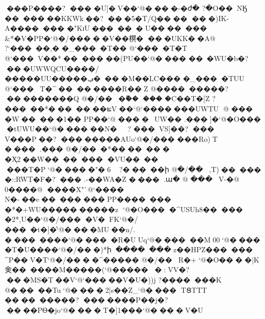 {{{{{{{{{{{{{{{{{{{{{{{{{{{{{{{{{���P����? ���	�U]�V��`@����-�ժ �   ?�O��NӃ
    �������KKWk��? ���5�T/Q���� ���)IK-A�� �����	�"KɪU������U�������
&*�V�PP�`@�/�����V��榠� ���UKK��A@ ?`�����,�     �_����T��     @`����T�T    @`���V��*   �����	��(P U��`@����	��~�WU�b�? ���UWWQCU����/�����UU�����ݠ����M��LC��� �_����TUU    @`���T�^   ��������R��Z @��������    �? ��������� Q @�/���ޫ    �� ���	�C��T�[Z ? �����*�   ������ʨV��`@`�������UWTU @ ���
�W   �����1��
PP��`@ ���� ~UW��%
.��� ]�`@�O���	�tUWU��`@����
��N� ? ���VS]�    �? ���	V���P ��? ��������AUo`@�/���	���Ro)T ����.���     @�/���*��   �����%
�Ҳ2��W�������
�VU����
���T�P`@�����"�6 ?�����ի     @�/��,T)   �����	�::RWT�F�? ���	.-��WA�Z ����.ա�     @ ���V-�    @ 0����@ ����X"`@`����	N�-��e��������PP�������
�*�+WU����������z%
`@�O���	�^USUh8�����	�2*, U��`@�/���
�V�FK`@�/����t�]\|�`@����MU��n/. ��������    `@�����R�UUq`@������M00`@����	�T�U����`@�/���)*ի�������z��HPZ� �����
^P��V�T`@�/����^����� @�/��R�+   `@�O����|K㑒������M��� ��(`@�����	�:VV�? ���MS�T��V`@`�����V�U�))j ?�������K    @�����Tu   `@����2|s��Z_`@����	 TՑTTT ��������    �? �������P��j�? ����PѲ�jo`@����T�]1���`@����V�U
}}}}}}}}}}}}}}}}}}}}}}}}}}}}}}}}}
